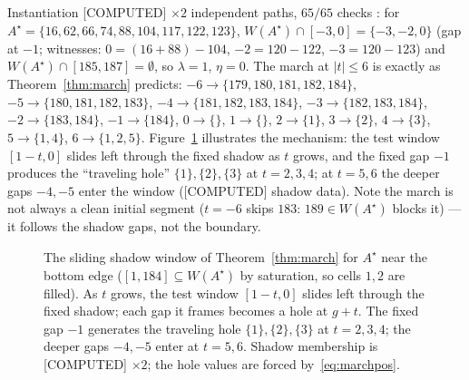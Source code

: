 \documentclass[11pt,a4paper]{article}
\theoremstyle{definition}
\begin{document}
Instantiation [COMPUTED] $\times2$ independent paths, $65/65$ checks
\cite{D227}: for $A^\star=\{16,62,66,74,88,104,117,122,123\}$,
$W(A^\star)\cap[-3,0]=\{-3,-2,0\}$ (gap at $-1$; witnesses:
$0=(16+88)-104$, $-2=120-122$, $-3=120-123$) and
$W(A^\star)\cap[185,187]=\emptyset$, so $\lambda=1$, $\eta=0$. The
march at $|t|\le6$ is exactly as Theorem~\ref{thm:march} predicts:
$-6\!\to\!\{179,180,181,182,184\}$,
$-5\!\to\!\{180,181,182,183\}$, $-4\!\to\!\{181,182,183,184\}$,
$-3\!\to\!\{182,183,184\}$, $-2\!\to\!\{183,184\}$,
$-1\!\to\!\{184\}$, $0\!\to\!\{\}$, $1\!\to\!\{\}$,
$2\!\to\!\{1\}$, $3\!\to\!\{2\}$, $4\!\to\!\{3\}$,
$5\!\to\!\{1,4\}$, $6\!\to\!\{1,2,5\}$.
Figure~\ref{fig:window} illustrates the mechanism: the test window
$[1-t,0]$ slides left through the fixed shadow as $t$ grows, and the
fixed gap $-1$ produces the ``traveling hole'' $\{1\},\{2\},\{3\}$
at $t=2,3,4$; at $t=5,6$ the deeper gaps $-4,-5$ enter the window
([COMPUTED] shadow data). Note the march is not always a clean initial
segment ($t=-6$ skips $183$: $189\in W(A^\star)$ blocks it) --- it
follows the shadow gaps, not the boundary.

\begin{figure}[t]
  \centering
  \caption{The sliding shadow window of Theorem~\ref{thm:march} for
    $A^\star$ near the bottom edge ($[1,184]\subseteq W(A^\star)$ by
    saturation, so cells $1,2$ are filled). As $t$ grows, the test
    window $[1-t,0]$ slides left through the fixed shadow; each gap it
    frames becomes a hole at $g+t$. The fixed gap $-1$ generates the
    traveling hole $\{1\},\{2\},\{3\}$ at $t=2,3,4$; the deeper gaps
    $-4,-5$ enter at $t=5,6$. Shadow membership is [COMPUTED]
    $\times2$; the hole values are forced by~\eqref{eq:marchpos}.}
  \label{fig:window}
\end{figure}
\end{document}
